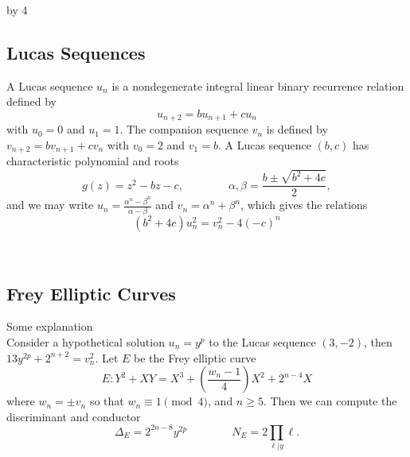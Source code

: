 \documentclass[14pt]{scrartcl}
\def\H{{\mathbb H}}
\def\Z{{\mathbb Z}}
\newcommand{\SL}{\text{SL}}
\def\anzspalten{4}
\newlength{\kastenwidth}
\newenvironment{kasten}{%
  \begin{lrbox}{\dummybox}%
    \begin{minipage}{0.96\linewidth}}%
    {\end{minipage}%
  \end{lrbox}%
  \raisebox{-\depth}{\psshadowbox[framesep=1em]{\usebox{\dummybox}}}\\[0.5em]}
\newenvironment{spalte}{%
  \setlength\kastenwidth{1.2\textwidth}
  \divide\kastenwidth by \anzspalten
  \begin{minipage}[t]{\kastenwidth}}{\end{minipage}\hfill}
\begin{document}
\begin{lrbox}{\spalten}
{\begin{spalte}
\begin{kasten}


\subsection*{\color{blue} Lucas Sequences}
A Lucas sequence $u_n$ is a nondegenerate integral linear binary recurrence relation defined by
\[u_{n+2} = bu_{n+1} + cu_n\]
with $u_0=0$ and $u_1 = 1$.  
The companion sequence $v_n$ is defined by $v_{n+2} = bv_{n+1} + cv_n$ with $v_0=2$ and $v_1 = b$.
A Lucas sequence $(b,c)$ has characteristic polynomial and roots
\[ g(z) = z^2 - bz - c, \qquad \qquad \alpha, \beta = \frac{b \pm \sqrt{b^2+4c}}{2},\]
and we may write
$u_n = \frac{\alpha^n - \beta^n}{\alpha - \beta}$ and $v_n = \alpha^n +\beta^n$, which gives the relations
\[(b^2+4c)u_n^2 = v_n^2 - 4(-c)^n\]

\end{kasten}

\begin{kasten}

\subsection*{ \color{blue} Frey Elliptic Curves}

Some explanation \\

Consider a hypothetical solution $u_n = y^p$ to the Lucas sequence $(3,-2)$, then $13y^{2p} + 2^{n+2} = v_n^2$.
Let $E$ be the Frey elliptic curve
\[ E: Y^2 + XY = X^3 + \left(\frac{w_n-1}{4} \right)X^2 + 2^{n-4}X \]
where $w_n = \pm v_n$ so that $w_n \equiv 1 \pmod{4}$, and $n \geq 5$.  Then we can compute the discriminant and conductor
\[ \Delta_E = 2^{2n-8}y^{2p} \qquad \qquad N_E = 2 \prod_{\ell | y} \ell. \]


\end{kasten}
\end{spalte}}
\end{lrbox}
\end{document}
